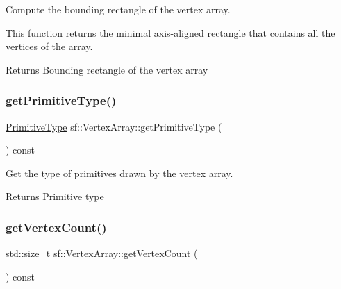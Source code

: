Compute the bounding rectangle of the vertex array. 

This function returns the minimal axis-\/aligned rectangle that contains all the vertices of the array.

\begin{DoxyReturn}{Returns}
Bounding rectangle of the vertex array \begin{DoxyVerb}\end{DoxyVerb}
 
\end{DoxyReturn}
\mbox{\label{classsf_1_1_vertex_array_aa1a60d84543aa6e220683349b645f130}} 
\subsubsection{\texorpdfstring{getPrimitiveType()}{getPrimitiveType()}}
{\footnotesize\ttfamily \mbox{\hyperlink{group__graphics_ga5ee56ac1339984909610713096283b1b}{Primitive\+Type}} sf\+::\+Vertex\+Array\+::get\+Primitive\+Type (\begin{DoxyParamCaption}{ }\end{DoxyParamCaption}) const}



Get the type of primitives drawn by the vertex array. 

\begin{DoxyReturn}{Returns}
Primitive type \begin{DoxyVerb}\end{DoxyVerb}
 
\end{DoxyReturn}
\mbox{\label{classsf_1_1_vertex_array_abda90e8d841a273d93164f0c0032bd8d}} 
\subsubsection{\texorpdfstring{getVertexCount()}{getVertexCount()}}
{\footnotesize\ttfamily std\+::size\+\_\+t sf\+::\+Vertex\+Array\+::get\+Vertex\+Count (\begin{DoxyParamCaption}{ }\end{DoxyParamCaption}) const}



